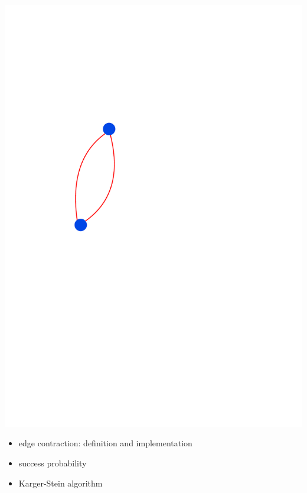 \documentclass[titlepage,german,presentation]{beamer}
\begin{document}
\begin{frame}
\includegraphics[height=0.6\textheight]{min-cut-7.pdf}
\vspace{-1cm}
\begin{itemize}
\item edge contraction: definition and implementation~\cite{Karger96}
\item success probability~\cite{Karger96}
\item Karger-Stein algorithm~\cite{Karger96}
\end{itemize}

\end{frame}
\end{document}
